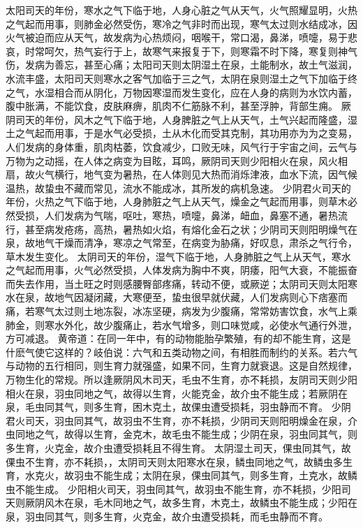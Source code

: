 \documentclass[12pt,UTF8]{ctexbook}
\begin{document}
太阳司天的年份，寒水之气下临于地，人身心脏之气从天气，火气照耀显明，火热之气起而用事，则肺金必然受伤，寒冷之气非时而出现，寒气太过则水结成冰，因火气被迫而应从天气，故发病为心热烦闷，咽喉干，常口渴，鼻涕，喷嚏，易于悲哀，时常呵欠，热气妄行于上，故寒气来报复于下，则寒霜不时下降，寒复则神气伤，发病为善忘，甚至心痛；太阳司天则太阴湿土在泉，土能制水，故土气滋润，水流丰盛，太阳司天则寒水之客气加临于三之气，太阴在泉则湿土之气下加临于终之气，水湿相合而从阴化，万物因寒湿而发生变化，应在人身的病则为水饮内蓄，腹中胀满，不能饮食，皮肤麻痹，肌肉不仁筋脉不利，甚至浮肿，背部生痈。
厥阴司天的年份，风木之气下临于地，人身脾脏之气上从天气，土气兴起而隆盛，湿土之气起而用事，于是水气必受损，土从木化而受其克制，其功用亦为为之变易，人们发病的身体重，肌肉枯萎，饮食减少，口败无味，风气行于宇宙之间，云气与万物为之动摇，在人体之病变为目眩，耳鸣，厥阴司天则少阳相火在泉，风火相扇，故火气横行，地气变为暑热，在人体则见大热而消烁津液，血水下流，因气候温热，故蛰虫不藏而常见，流水不能成冰，其所发的病机急速。
少阴君火司天的年份，火热之气下临于地，人身肺脏之气上从天气，燥金之气起而用事，则草木必然受损，人们发病为气喘，呕吐，寒热，喷嚏，鼻涕，衄血，鼻塞不通，暑热流行，甚至病发疮疡，高热，暑热如火焰，有熔化金石之状；少阴司天则阳明燥气在泉，故地气干燥而清净，寒凉之气常至，在病变为胁痛，好叹息，肃杀之气行令，草木发生变化。
太阴司天的年份，湿气下临于地，人身肺脏之气上从天气，寒水之气起而用事，火气必然受损，人体发病为胸中不爽，阴痿，阳气大衰，不能振奋而失去作用，当土旺之时则感腰臀部疼痛，转动不便，或厥逆；太阴司天则太阳寒水在泉，故地气因凝闭藏，大寒便至，蛰虫很早就伏藏，人们发病则心下痞塞而痛，若寒气太过则土地冻裂，冰冻坚硬，病发为少腹痛，常常妨害饮食，水气上乘肺金，则寒水外化，故少腹痛止，若水气增多，则口味觉咸，必使水气通行外泄，方可减退。
黄帝道：在同一年中，有的动物能胎孕繁殖，有的却不能生育，这是什麽气使它这样的？岐伯说：六气和五类动物之间，有相胜而制约的关系。若六气与动物的五行相同，则生育力就强盛，如果不同，生育力就衰退。这是自然规律，万物生化的常规。所以逢厥阴风木司天，毛虫不生育，亦不耗损，友阴司天则少阳相火在泉，羽虫同地之气，故得以生育，火能克金，故介虫不能生成；若厥阴在泉，毛虫同其气，则多生育，困木克土，故倮虫遭受损耗，羽虫静而不育。
少阴君火司天，羽虫同其气，故羽虫不生育，亦不耗损，少阴司天则阳明燥金在泉，介虫同地之气，故得以生育，金克木，故毛虫不能生成；少阴在泉，羽虫同其气，则多生育，火克金，故介虫遭受损耗且不得生育。
太阴湿土司天，倮虫同其气，故倮虫不生育，亦不耗损，，太阴司天则太阳寒水在泉，鳞虫同地之气，故鳞虫多生育，水克火，故羽虫不能生成；太阴在泉，倮虫同其气，则多生育，土克水，故鳞虫不能生成。
少阳相火司天，羽虫同其气，故羽虫不能生育，亦不耗损，少阳司天则厥阴风木在泉，毛木同地之气，故多生育，木克土，故鳞虫不能生成；少阳在泉，羽虫同其气，则多生育，火克金，故介虫遭受损耗，而毛虫静而不育。
\end{document}
